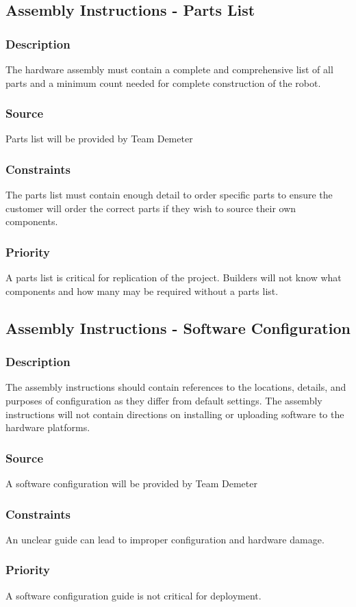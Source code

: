 \subsection{Assembly Instructions - Parts List}
\subsubsection{Description}
The hardware assembly must contain a complete and comprehensive list of all parts and a minimum count needed for complete construction of the robot.
\subsubsection{Source}
Parts list will be provided by Team Demeter
\subsubsection{Constraints}
The parts list must contain enough detail to order specific parts to ensure the customer will order the correct parts if they wish to source their own components.
\subsubsection{Priority}
A parts list is critical for replication of the project. Builders will not know what components and how many may be required without a parts list.

\subsection{Assembly Instructions - Software Configuration}
\subsubsection{Description}
The assembly instructions should contain references to the locations, details, and purposes of configuration as they differ from default settings. The assembly instructions will not contain directions on installing or uploading software to the hardware platforms.
\subsubsection{Source}
A software configuration will be provided by Team Demeter
\subsubsection{Constraints}
An unclear guide can lead to improper configuration and hardware damage.
\subsubsection{Priority}
A software configuration guide is not critical for deployment.
